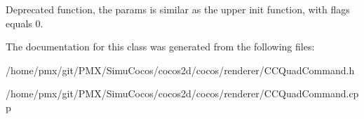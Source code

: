 Deprecated function, the params is similar as the upper init function, with flags equals 0. 

The documentation for this class was generated from the following files\+:\begin{DoxyCompactItemize}
\item 
/home/pmx/git/\+P\+M\+X/\+Simu\+Cocos/cocos2d/cocos/renderer/C\+C\+Quad\+Command.\+h\item 
/home/pmx/git/\+P\+M\+X/\+Simu\+Cocos/cocos2d/cocos/renderer/C\+C\+Quad\+Command.\+cpp\end{DoxyCompactItemize}
